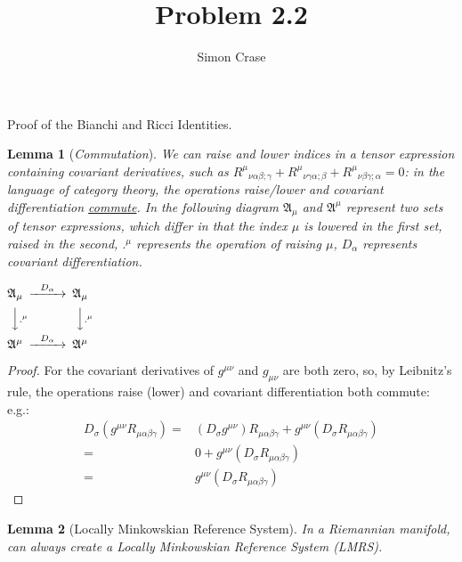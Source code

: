 \documentclass[10pt,a4paper]{article}
\author{Simon Crase}
\title{Problem 2.2}
\newtheorem{lemma}{Lemma}
\begin{document}
	\maketitle
		\thispagestyle{fancy}%
		
		Proof of the Bianchi and Ricci Identities.
		
		\begin{lemma}[\emph{Commutation}]\label{commutation_indices}
			We can raise and lower indices in a tensor expression containing covariant derivatives, such as ${R^\mu}_{\nu\alpha\beta;\gamma} +	{R^\mu}_{\nu\gamma\alpha;\beta} +	{R^\mu}_{\nu\beta\gamma;\alpha} = 0$: in the language of category theory, the operations raise/lower and covariant differentiation \underline{commute}.  In the following diagram $\mathfrak{A}_{\mu}$ and  $\mathfrak{A}^{\mu}$ represent two sets of tensor expressions, which differ in that the index $\mu$ is lowered in the first set, raised in the second, $.^{\mu}$ represents the operation of raising $\mu$, $D_{\alpha}$ represents covariant differentiation.
		
		\begin{center}
			$\begin{CD}
			\mathfrak{A}_{\mu}     @>D_{\alpha}>>  \mathfrak{A}_{\mu}\\
			@VV.^{\mu} V        @VV.^{\mu} V\\
			\mathfrak{A}^{\mu}     @>D_{\alpha}>>   \mathfrak{A}^{\mu}
			\end{CD}$
		\end{center}
		\end{lemma}
		\begin{proof}
			For the covariant derivatives of $g^{\mu\nu}$ and $g_{\mu\nu}$ are both zero, so, by Leibnitz's rule, the operations raise (lower) and covariant differentiation both commute: e.g.:
			\begin{align*}
			D_{\sigma}(g^{\mu\nu}R_{\mu\alpha\beta\gamma})=&(D_{\sigma}g^{\mu\nu})R_{\mu\alpha\beta\gamma}+g^{\mu\nu}(D_{\sigma}R_{\mu\alpha\beta\gamma})\\
			=&0+g^{\mu\nu}(D_{\sigma}R_{\mu\alpha\beta\gamma})\\
			=&g^{\mu\nu}(D_{\sigma}R_{\mu\alpha\beta\gamma})
			\end{align*}
		\end{proof}
		\begin{lemma}[Locally Minkowskian Reference System]\label{lmrs}
				In a Riemannian manifold, can always create a Locally Minkowskian Reference System (LMRS).
		\end{lemma}
\end{document}
